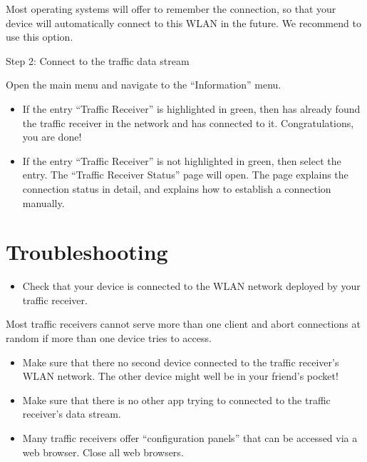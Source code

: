 \documentclass[letterpaper,10pt,english]{sphinxmanual}
\begin{document}
\sphinxAtStartPar
Most operating systems will offer to remember the connection, so that your
device will automatically connect to this WLAN in the future. We recommend to
use this option.

\sphinxAtStartPar
Step 2: Connect to the traffic data stream

\sphinxAtStartPar
Open the main menu and navigate to the “Information” menu.
\begin{itemize}
\item {} 
\sphinxAtStartPar
If the entry “Traffic Receiver” is highlighted in green, then  has already found the traffic receiver in the network and has
connected to it. Congratulations, you are done!

\item {} 
\sphinxAtStartPar
If the entry “Traffic Receiver” is not highlighted in green, then select the
entry. The “Traffic Receiver Status” page will open. The page explains the
connection status in detail, and explains how to establish a connection
manually.

\end{itemize}


\section{Troubleshooting}
\label{\detokenize{02-steps/traffic:troubleshooting}}
\sphinxAtStartPar
{}
\begin{itemize}
\item {} 
\sphinxAtStartPar
Check that your device is connected to the WLAN network deployed by your
traffic receiver.

\end{itemize}

\sphinxAtStartPar
{}

\sphinxAtStartPar
Most traffic receivers cannot serve more than one client and abort connections
at random if more than one device tries to access.
\begin{itemize}
\item {} 
\sphinxAtStartPar
Make sure that there no second device connected to the traffic receiver’s WLAN
network. The other device might well be in your friend’s pocket!

\item {} 
\sphinxAtStartPar
Make sure that there is no other app trying to connected to the traffic
receiver’s data stream.

\item {} 
\sphinxAtStartPar
Many traffic receivers offer “configuration panels” that can be accessed via a
web browser. Close all web browsers.

\end{itemize}
\end{document}
